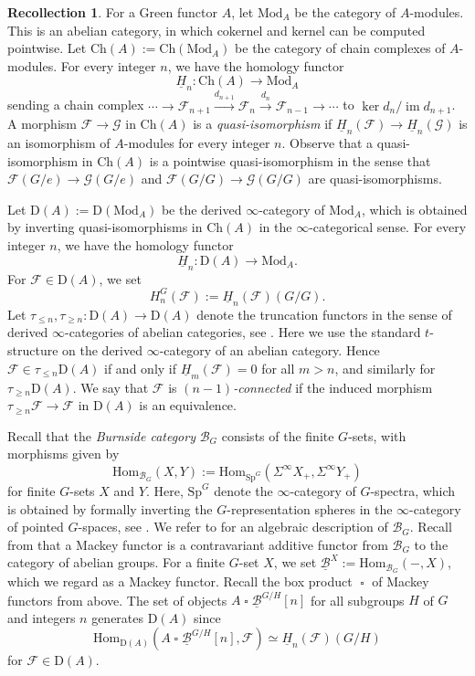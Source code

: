 \documentclass[10pt]{amsart}
\theoremstyle{definition}
\newtheorem{recoll}[thm]{Recollection}
\numberwithin{equation}{section}
\newcommand{\cB}{\mathcal{B}}
\newcommand{\cF}{\mathcal{F}}
\newcommand{\cG}{\mathcal{G}}
\newcommand{\rD}{\mathrm{D}}
\newcommand{\ul}{\underline}
\DeclareMathOperator{\im}{im}
\newcommand{\Mod}{\mathrm{Mod}}
\newcommand{\Sp}{\mathrm{Sp}}
\newcommand{\Ch}{\mathrm{Ch}}
\newcommand{\Hom}{\mathrm{Hom}}
\DeclareMathOperator{\sotimes}{\square}
\begin{document}
\begin{recoll}
\label{model structures on A-modules}
For a Green functor $A$,
let $\Mod_{A}$ be the category of $A$-modules.
This is an abelian category, in which cokernel and kernel can be computed pointwise.
Let $\Ch(A):=\Ch(\Mod_A)$ be the category of chain complexes of $A$-modules.
For every integer $n$,
we have the homology functor
\[
\ul{H}_n\colon \Ch(A)\to \Mod_A
\]
sending a chain complex $\cdots \to \cF_{n+1}\xrightarrow{d_{n+1}} \cF_n \xrightarrow{d_n} \cF_{n-1}\to \cdots$ to $\ker d_n/\im d_{n+1}$.
A morphism $\cF\to \cG$ in $\Ch(A)$ is a \emph{quasi-isomorphism} if $\ul{H}_n(\cF)\to \ul{H}_n(\cG)$ is an isomorphism of $A$-modules for every integer $n$.
Observe that a quasi-isomorphism in $\Ch(A)$ is a pointwise quasi-isomorphism in the sense that $\cF(G/e)\to \cG(G/e)$ and $\cF(G/G)\to \cG(G/G)$ are quasi-isomorphisms.


Let $\rD(A):=\rD(\Mod_{A})$ be the derived $\infty$-category of $\Mod_{A}$,
which is obtained by inverting quasi-isomorphisms in $\Ch(A)$ in the $\infty$-categorical sense.
For every integer $n$,
we have the homology functor
\[
\ul{H}_n\colon \rD(A)\to \Mod_{A}.
\]
For $\cF\in \rD(A)$,
we set
\[
H_n^{G}(\cF):=\ul{H}_n(\cF)(G/G).
\]
Let $\tau_{\leq n},\tau_{\geq n}\colon \rD(A)\to \rD(A)$ denote the truncation functors in the sense of derived $\infty$-categories of abelian categories,
see \cite[Notation 1.2.1.7]{HA}.
Here we use the standard $t$-structure on the derived $\infty$-category of an abelian category.
Hence $\cF \in  \tau_{\leq n} \rD(A)$ if and only if $\ul{H}_m(\cF)=0$ for all $m>n$, and similarly for $\tau_{\geq n} \rD(A)$.
We say that $\cF$ is \emph{$(n-1)$-connected} if the induced morphism $\tau_{\geq n}\cF\to \cF$ in $\rD(A)$ is an equivalence.


Recall that the \emph{Burnside category} $\cB_G$ consists of the finite $G$-sets, with
morphisms given by
\[
\Hom_{\cB_G}(X,Y)
:=
\Hom_{\Sp^G}(\Sigma^\infty X_+,\Sigma^\infty Y_+)
\]
for finite $G$-sets $X$ and $Y$.
Here, $\Sp^G$ denote the $\infty$-category of $G$-spectra,
which is obtained by formally inverting the $G$-representation spheres in the $\infty$-category of pointed $G$-spaces,
see \cite[section 9.2]{BH21}.
We refer to \cite[section V.9]{LMS86} for an algebraic description of $\cB_G$.
Recall from \cite[Definition 2.1]{LM06} that a Mackey functor is a contravariant additive functor from $\cB_G$ to the category of abelian groups.
For a finite $G$-set $X$,
we set $\ul{\cB}^X:=\Hom_{\cB_G}(-,X)$,
which we regard as a Mackey functor.
Recall the box product $\sotimes$ of Mackey functors from above.
The set of objects $A\sotimes \ul{\cB}^{G/H}[n]$
for all subgroups $H$ of $G$ and integers $n$ generates $\rD(A)$ since
\[
\Hom_{\rD(A)}
(A\sotimes \ul{\cB}^{G/H}[n],\cF)
\simeq
\ul{H}_n(\cF)(G/H)
\]
for $\cF\in \rD(A)$.


\end{recoll}
\end{document}
